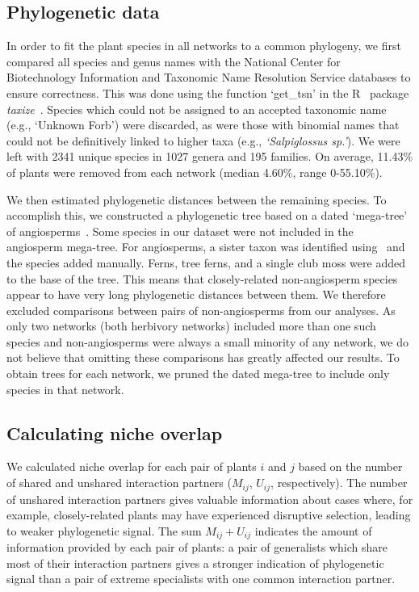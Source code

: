 \documentclass[12pt]{article}
\begin{document}
\begin{spacing}{1.5}
  \subsection*{Phylogenetic data}

    In order to fit the plant species in all networks to a common phylogeny, 
    we first compared all species and genus names with the 
    National Center for Biotechnology Information
    and Taxonomic Name Resolution Service databases to ensure
    correctness. This was done using the function `get\_tsn' in the R~\citep{R}
    package \emph{taxize}~\citep{taxize1,taxize2}. Species which could not 
    be assigned to an accepted taxonomic name (e.g., `Unknown Forb') were 
    discarded, as were those with binomial names that could not be definitively 
    linked to higher taxa (e.g., \emph{`Salpiglossus sp.'}). We were left with 
    2341 unique species in 1027 genera and 195 families. On average, 11.43\% of 
    plants were removed from each network (median 4.60\%, range 0-55.10\%).


    We then estimated phylogenetic distances between the remaining species. To accomplish 
    this, we constructed a phylogenetic tree based on a dated
    `mega-tree' of angiosperms~\citep{Zanne2014}. Some species in our dataset were not included
    in the angiosperm mega-tree. For angiosperms,
    a sister taxon was identified using~\citet{APW} and the species added manually.
    Ferns, tree ferns, and a single club moss were added to the base of the tree.
    This means that closely-related non-angiosperm species appear to have very long 
    phylogenetic distances between them. We therefore excluded comparisons 
    between pairs of non-angiosperms from our analyses. As only two networks (both 
    herbivory networks) included more than one such species and non-angiosperms
    were always a small minority of any network, we do not 
    believe that omitting these comparisons has greatly affected our results.
    To obtain trees for each network, we 
    pruned the dated mega-tree to include only species in that network.


  \subsection*{Calculating niche overlap}

    We calculated niche overlap for each pair of plants $i$ and $j$ based on the number of shared and unshared interaction partners ($M_{ij}$, $U_{ij}$, respectively). 
    The number of unshared interaction 
    partners gives valuable information about cases where, for example, 
    closely-related plants may have experienced disruptive selection, leading to weaker phylogenetic signal. 
    The sum $M_{ij} + U_{ij}$ indicates the amount of information  provided by each pair of plants: a pair of generalists which share most of their interaction partners gives a stronger indication of phylogenetic signal than a pair of extreme specialists with one common interaction partner.



\end{spacing}
\end{document}
